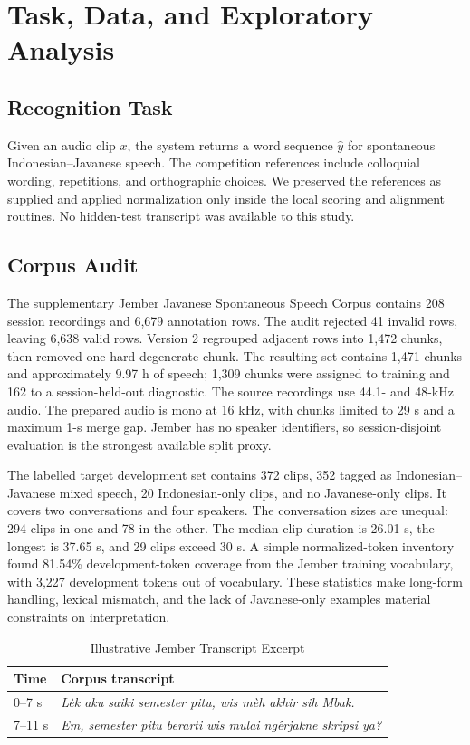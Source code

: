 \documentclass[journal]{IEEEtran}
\begin{document}
\section{Task, Data, and Exploratory Analysis}
\subsection{Recognition Task}
Given an audio clip \(x\), the system returns a word sequence \(\hat{y}\) for spontaneous Indonesian--Javanese speech. The competition references include colloquial wording, repetitions, and orthographic choices. We preserved the references as supplied and applied normalization only inside the local scoring and alignment routines. No hidden-test transcript was available to this study.

\subsection{Corpus Audit}
The supplementary Jember Javanese Spontaneous Speech Corpus contains 208 session recordings and 6,679 annotation rows. The audit rejected 41 invalid rows, leaving 6,638 valid rows. Version 2 regrouped adjacent rows into 1,472 chunks, then removed one hard-degenerate chunk. The resulting set contains 1,471 chunks and approximately 9.97 h of speech; 1,309 chunks were assigned to training and 162 to a session-held-out diagnostic. The source recordings use 44.1- and 48-kHz audio. The prepared audio is mono at 16 kHz, with chunks limited to 29 s and a maximum 1-s merge gap. Jember has no speaker identifiers, so session-disjoint evaluation is the strongest available split proxy.

The labelled target development set contains 372 clips, 352 tagged as Indonesian--Javanese mixed speech, 20 Indonesian-only clips, and no Javanese-only clips. It covers two conversations and four speakers. The conversation sizes are unequal: 294 clips in one and 78 in the other. The median clip duration is 26.01 s, the longest is 37.65 s, and 29 clips exceed 30 s. A simple normalized-token inventory found 81.54\% development-token coverage from the Jember training vocabulary, with 3,227 development tokens out of vocabulary. These statistics make long-form handling, lexical mismatch, and the lack of Javanese-only examples material constraints on interpretation.

\begin{table}[!t]
\caption{Illustrative Jember Transcript Excerpt}
\label{tab:sample}
\centering
\footnotesize
\begin{tabularx}{\columnwidth}{p{}Y}
\toprule
Time & Corpus transcript \\
--7 s & \textit{Lèk aku saiki semester pitu, wis mèh akhir sih Mbak.} \\
7--11 s & \textit{Em, semester pitu berarti wis mulai ngêrjakne skripsi ya?} \\
\bottomrule
\end{tabularx}
\end{table}
\end{document}
